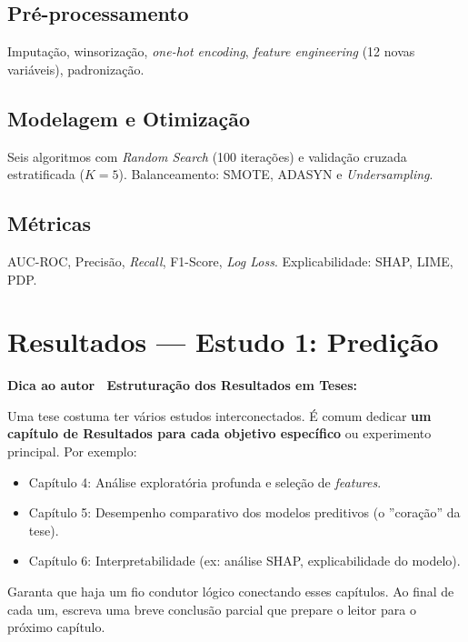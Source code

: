 \documentclass[
    12pt,
    oneside,
    a4paper,
    english,
    brazilian
    ]{abntex2}
\numberwithin{equation}{chapter}
\newenvironment{dica}{%
    \par\medskip
    \color{blue!60!black}\small\itshape
}{%
    \par\medskip
}
\begin{document}


\section{Pré-processamento}

Imputação, winsorização, \textit{one-hot encoding}, \textit{feature engineering} (12 novas variáveis), padronização.

\section{Modelagem e Otimização}

Seis algoritmos com \textit{Random Search} (100 iterações) e validação cruzada estratificada ($K=5$). Balanceamento: SMOTE, ADASYN e \textit{Undersampling}.

\section{Métricas}

AUC-ROC, Precisão, \textit{Recall}, F1-Score, \textit{Log Loss}. Explicabilidade: SHAP, LIME, PDP.

\chapter{Resultados --- Estudo 1: Predição}

\begin{dica}
\noindent\textbf{Dica ao autor \textemdash\ Estruturação dos Resultados em Teses:}

Uma tese costuma ter vários estudos interconectados. É comum dedicar \textbf{um capítulo de Resultados para cada objetivo específico} ou experimento principal. Por exemplo:
\begin{itemize}
    \item Capítulo 4: Análise exploratória profunda e seleção de \textit{features}.
    \item Capítulo 5: Desempenho comparativo dos modelos preditivos (o ''coração'' da tese).
    \item Capítulo 6: Interpretabilidade (ex: análise SHAP, explicabilidade do modelo).
\end{itemize}
Garanta que haja um fio condutor lógico conectando esses capítulos. Ao final de cada um, escreva uma breve conclusão parcial que prepare o leitor para o próximo capítulo.
\end{dica}
\end{document}
